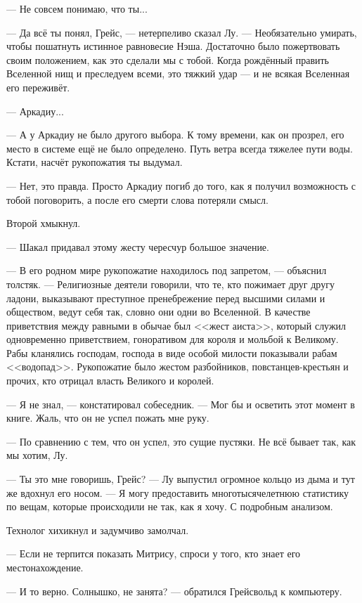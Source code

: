 --- Не совсем понимаю, что ты...

--- Да всё ты понял, Грейс, --- нетерпеливо сказал Лу.
--- Необязательно умирать, чтобы пошатнуть истинное равновесие Нэша.
Достаточно было пожертвовать своим положением, как это сделали мы с тобой.
Когда рождённый править Вселенной нищ и преследуем всеми, это тяжкий удар --- и не всякая Вселенная его переживёт.

--- Аркадиу...

--- А у Аркадиу не было другого выбора.
К тому времени, как он прозрел, его место в системе ещё не было определено.
Путь ветра всегда тяжелее пути воды.
Кстати, насчёт рукопожатия ты выдумал.

--- Нет, это правда.
Просто Аркадиу погиб до того, как я получил возможность с тобой поговорить, а после его смерти слова потеряли смысл.

Второй хмыкнул.

--- Шакал придавал этому жесту чересчур большое значение.

--- В его родном мире рукопожатие находилось под запретом, --- объяснил толстяк.
--- Религиозные деятели говорили, что те, кто пожимает друг другу ладони, выказывают преступное пренебрежение перед высшими силами и обществом, ведут себя так, словно они одни во Вселенной.
В качестве приветствия между равными в обычае был <<жест аиста>>, который служил одновременно приветствием, гоноративом для короля и мольбой к Великому.
Рабы кланялись господам, господа в виде особой милости показывали рабам <<водопад>>.
Рукопожатие было жестом разбойников, повстанцев-крестьян и прочих, кто отрицал власть Великого и королей.

--- Я не знал, --- констатировал собеседник.
--- Мог бы и осветить этот момент в книге.
Жаль, что он не успел пожать мне руку.

--- По сравнению с тем, что он успел, это сущие пустяки.
Не всё бывает так, как мы хотим, Лу.

--- Ты это мне говоришь, Грейс? --- Лу выпустил огромное кольцо из дыма и тут же вдохнул его носом.
--- Я могу предоставить многотысячелетнюю статистику по вещам, которые происходили не так, как я хочу.
С подробным анализом.

Технолог хихикнул и задумчиво замолчал.

--- Если не терпится показать Митрису, спроси у того, кто знает его местонахождение.

--- И то верно.
Солнышко, не занята? --- обратился Грейсвольд к компьютеру.

